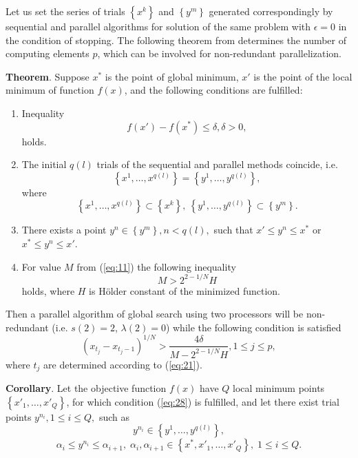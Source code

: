 \documentclass[smallcondensed]{svjour3}     %
\begin{document}
Let us set the series of trials $\left\{x^k\right\}$ and $\left\{y^m\right\}$ generated correspondingly by sequential and parallel algorithms for solution of the same problem with $\epsilon = 0$ in the condition of stopping. The following theorem from \cite{RefStrongin2000} determines the number of computing elements $p$, which can be involved for non-redundant parallelization.

\textbf{Theorem}. Suppose $x^\ast$ is the point of global minimum, $x'$ is the point of the local minimum of function $f(x)$, and the following conditions are fulfilled:
\begin{enumerate}
	\item
	Inequality 
	\begin{equation}\label{eq:28}
	f(x')-f(x^\ast)\leq \delta, \delta>0,
	\end{equation}
	holds.
	\item
	The initial $q(l)$ trials of the sequential and parallel methods coincide, i.e.
	\[
	\left\{x^1,\dots,x^{q(l)}\right\}=\left\{y^1,\dots,y^{q(l)}\right\},
	\]
	where 
	\[
	\left\{x^1,\dots,x^{q(l)}\right\}\subset\left\{x^k\right\}, \ \left\{y^1,\dots,y^{q(l)}\right\}\subset\left\{y^m\right\}.
	\]
	\item
	There exists a point $y^n\in \left\{y^m\right\}, n<q(l),$ such that $x'\leq y^n \leq x^\ast$ or \mbox{$x^\ast \leq y^n \leq x'$}.
	\item
	For value $M$ from (\ref{eq:11}) the following inequality
	\[
	M>2^{2-1/N}H
	\]
	holds, where $H$ is H{\"o}lder constant of the minimized function.
\end{enumerate}

Then a parallel algorithm of global search using two processors will be non-redundant (i.e. $s(2)=2$, $\lambda(2)=0$) while the following condition is satisfied 
\begin{equation}\label{eq:32}
\left(x_{t_j}-x_{t_j-1}\right)^{1/N} > \frac{4\delta}{M-2^{2-1/N}H}, 1\leq j\leq p,	
\end{equation}
where $t_j$ are determined according to (\ref{eq:21}).

\textbf{Corollary}. Let the objective function $f(x)$ have $Q$ local minimum points $\left\{x'_1,\dots,x'_Q\right\}$, for which condition (\ref{eq:28}) is fulfilled, and let there exist trial points $y^{n_i}, 1\leq i \leq Q,$ such as
\[
y^{n_i}\in \left\{y^1,\dots,y^{q(l)}\right\},
\]
\[
\alpha_i \leq y^{n_i} \leq \alpha_{i+1}, \; \alpha_i, \alpha_{i+1} \in \left\{x^\ast, x'_1,\dots,x'_Q\right\}, \; 1\leq i \leq Q.
\]
\end{document}
